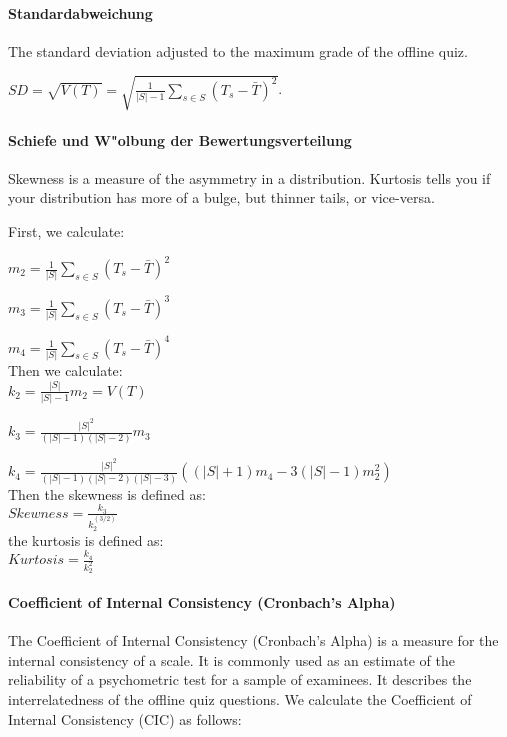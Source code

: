 \documentclass[12pt]{report}
\begin{document}
\paragraph{Standardabweichung}
The standard deviation adjusted to the maximum grade of the offline quiz.

$SD = \sqrt{V(T)} = \sqrt{\frac{1}{|S| - 1}\sum\limits_{s\in S}(T_s - \bar{T})^2}$.

\paragraph{Schiefe und W"olbung der Bewertungsverteilung}
Skewness is a measure of the asymmetry in a distribution. Kurtosis tells you if your distribution has more of a bulge, but thinner tails, or vice-versa. 

First, we calculate:

$m_2=\frac{1}{|S|}\sum\limits_{s\in S}{(T_s - \bar{T})^2}$

$m_3=\frac{1}{|S|}\sum\limits_{s\in S}{(T_s - \bar{T})^3}$

$m_4=\frac{1}{|S|}\sum\limits_{s\in S}{(T_s - \bar{T})^4}$\\

Then we calculate:\\

$k_2 = \frac{|S|}{|S| - 1}m_2 = V(T)$

$k_3 = \frac{|S|^2}{(|S|-1)(|S|-2)} m_3$

$k_4 = \frac{|S|^2}{(|S|-1)(|S|-2)(|S|-3)}\left((|S|+1)m_4-3(|S|-1)m_2^2\right)$\\

Then the skewness is defined as:\\

 $Skewness = \frac{k_3}{k_2^(3/2)}$\\

the kurtosis is defined as:\\

 $Kurtosis = \frac{k_4}{k_2^2}$


\paragraph{Coefficient of Internal Consistency (Cronbach's Alpha)}
The Coefficient of Internal Consistency (Cronbach's Alpha) is a measure for the internal consistency of a scale. It is commonly used as an estimate of the reliability of a psychometric test for a sample of examinees. It describes the  interrelatedness of the offline quiz questions. We calculate the Coefficient of Internal Consistency (CIC) as follows:
\end{document}
